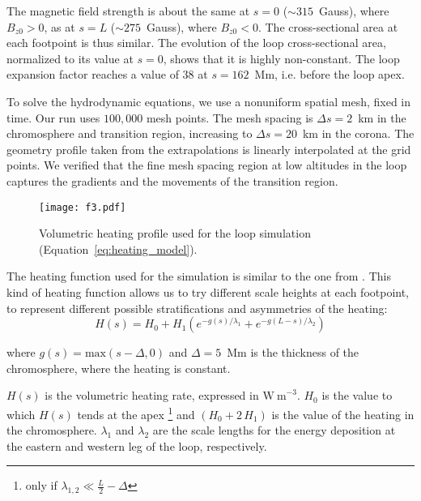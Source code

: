\documentclass[preprint2]{aastex6}
\begin{document}
The magnetic field strength is about the same at $s=0$ ($\sim315$~Gauss), where $B_{z0}>0$, as at $s=L$  ($\sim275$~Gauss), where $B_{z0}<0$.  
The cross-sectional area at each footpoint is thus similar.
The evolution of the loop cross-sectional area, normalized to its value at $s=0$, shows that it is highly non-constant. The loop expansion factor reaches a value of 38 at $s=162$~Mm, i.e. before the loop apex. 

To solve the hydrodynamic equations, we use a nonuniform spatial mesh, fixed in time. Our run uses $100, 000$ mesh points. The mesh spacing is $\Delta s=2$~km in the chromosphere and transition region, increasing to $\Delta s=20$~km in the corona. The geometry profile taken from the extrapolations is linearly interpolated at the grid points. 
We verified that the fine mesh spacing region at low altitudes in the loop captures the gradients and the movements of the transition region. 



	\begin{figure}
		\centering
                 \texttt{[image: f3.pdf]}
                 \caption{Volumetric heating profile used for the loop simulation (Equation~\ref{eq:heating_model}).}
                 \label{fig:heating_profile}
	\end{figure}
	
	
\medskip
	
The heating function used for the simulation is similar to the one from \citet[Equation 6]{mikic2013}. This kind of heating function allows us to try different scale heights at each footpoint, to represent different possible stratifications and asymmetries of the heating:
\begin{equation}
H(s) = H_0 +  H_1(e^{-g(s)/\lambda_{1}}+e^{-g(L-s)/\lambda_{2}})   
\label{eq:heating_model}
\end{equation}

where $g(s)=\mathrm{max}(s-\Delta,0)$  and $\Delta=5$~Mm is the thickness of the chromosphere, where the heating is constant.

$H(s)$ is the volumetric heating rate, expressed in $\mathrm{W~m}^{-3}$. 
$H_0$ is the value to which $H(s)$ tends at the apex \footnote{only if $\lambda_{1,2} \ll \frac{L}{2}-\Delta$} and $(H_0+2\,H_1)$ is the value of the heating in the chromosphere.
$\lambda_1$ and $\lambda_2$ are the scale lengths for the energy deposition at the eastern and western leg of the loop, respectively.
\end{document}
